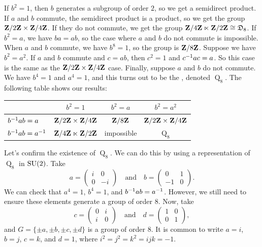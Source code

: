 \documentclass[11pt, twoside]{amsart}
\begin{document}
If $b^2=1$, then $b$ generates a subgroup of order $2$, so we get a semidirect product. If $a$ and $b$ commute, the semidirect product is a product, so we get the group $\mathbf{Z}/2\mathbf{Z}  \times \mathbf{Z}/4\mathbf{Z} $. If they do not commute, we get the group $\mathbf{Z}/4\mathbf{Z}  \ltimes \mathbf{Z}/2\mathbf{Z} \cong \mathfrak{D}_8$. If $b^2=a$, we have $ba = ab$, so the case where $a$ and $b$ do not commute is impossible. When $a$ and $b$ commute, we have $b^8 = 1$, so the group is $\mathbf{Z}/8\mathbf{Z}$. Suppose we have $b^2 = a^2$. If $a$ and $b$ commute and $c=ab$, then $c^2 = 1$ and $c^{-1} ac = a$. So this case is the same as the $\mathbf{Z}/2\mathbf{Z}  \times \mathbf{Z}/4\mathbf{Z} $ case. Finally, suppose $a$ and $b$ do not commute. We have $b^4= 1$ and $a^4 =1$, and this turns out to be the , denoted $\operatorname{Q}_8 $. The following table shows our results:
\begin{center}
\begin{tabular}{lccc} 
&$b^2=1$ &$ b^2 = a$ & $b^2 = a^2$\\
\midrule
$b^{-1} ab=a $\ &$\mathbf{Z}/2\mathbf{Z}  \times \mathbf{Z}/4\mathbf{Z} $ &$\mathbf{Z}/8\mathbf{Z}$& $\mathbf{Z}/2\mathbf{Z}  \times \mathbf{Z}/4\mathbf{Z} $\\
$b^{-1} a b = a^{-1}$\hspace*{10pt} &$\mathbf{Z}/4\mathbf{Z}  \ltimes \mathbf{Z}/2\mathbf{Z} $& \textrm{impossible}& $\operatorname{Q}_8 $\\
\end{tabular}
\end{center}

Let's confirm the existence of $\operatorname{Q}_8 $. We can do this by using a representation of $\operatorname{Q}_8 $ in $\operatorname{SU}(2)$. Take
$$
a = \left ( \begin{array} {cc} i & 0 \\0& -i\end{array}\right) \quad \textrm{and} \quad b = \left ( \begin{array} {cc} 0 & 1\\-1& 0\end{array}\right).
$$
We can check that $a^4 =1$, $b^4 = 1$, and $b^{-1} a b = a^{-1}$. However, we still need to ensure these elements generate a group of order $8$. Now, take 
$$
c = \left ( \begin{array} {cc} 0& i \\i& 0\end{array}\right) \quad \textrm{and} \quad d= \left ( \begin{array} {cc} 1 & 0\\0& 1\end{array}\right),
$$
and $G = \{\pm a,\pm b,\pm c,\pm d\}$ is a group of order $8$. It is common to write $a=i$, $b = j$, $c=k$, and $d=1$, where $i^2 =j^2 =k^2 = ijk = -1$.
\end{document}
